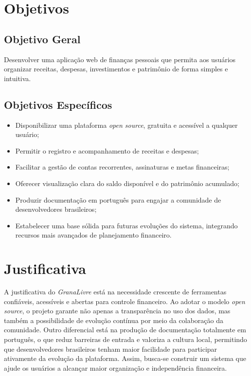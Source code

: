 \section{Objetivos}

\subsection{Objetivo Geral}
Desenvolver uma aplicação web de finanças pessoais que permita aos usuários organizar receitas, despesas, investimentos e patrimônio de forma simples e intuitiva.

\subsection{Objetivos Específicos}
\begin{itemize}
    \item Disponibilizar uma plataforma \textit{open source}, gratuita e acessível a qualquer usuário;
    \item Permitir o registro e acompanhamento de receitas e despesas;
    \item Facilitar a gestão de contas recorrentes, assinaturas e metas financeiras;
    \item Oferecer visualização clara do saldo disponível e do patrimônio acumulado;
    \item Produzir documentação em português para engajar a comunidade de desenvolvedores brasileiros;
    \item Estabelecer uma base sólida para futuras evoluções do sistema, integrando recursos mais avançados de planejamento financeiro.
\end{itemize}

\section{Justificativa}
A justificativa do \textit{GranaLivre} está na necessidade crescente de ferramentas confiáveis, acessíveis e abertas para controle financeiro. Ao adotar o modelo \textit{open source}, o projeto garante não apenas a transparência no uso dos dados, mas também a possibilidade de evolução contínua por meio da colaboração da comunidade. Outro diferencial está na produção de documentação totalmente em português, o que reduz barreiras de entrada e valoriza a cultura local, permitindo que desenvolvedores brasileiros tenham maior facilidade para participar ativamente da evolução da plataforma. Assim, busca-se construir um sistema que ajude os usuários a alcançar maior organização e independência financeira.